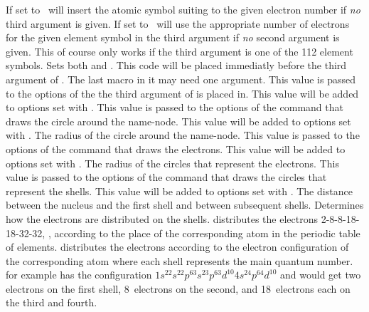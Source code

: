 \documentclass[load-preamble+]{cnltx-doc}
\begin{document}
\begin{options}
    If set to  \BOHR\ will insert the atomic symbol suiting to the
    given electron number if \emph{no} third argument is given.
    If set to  \BOHR\ will use the appropriate number of electrons
    for the given element symbol in the third argument if \emph{no} second
    argument is given.  This of course only works if the third argument is one
    of the 112 element symbols.
    Sets both  and .
  \Default
    This code will be placed immediatly before the third argument of
    .  The last macro in it may need one argument.
  \Default
    This value is passed to the options of the  the third argument
    of  is placed in.
  \Default
    This value will be added to options set with .
    This value is passed to the options of the  command that draws
    the circle around the name-node.
  \Default
    This value will be added to options set with .
  \Default{1em}
    The radius of the circle around the name-node.
    This value is passed to the options of the  command that draws
    the electrons.
  \Default
    This value will be added to options set with .
  \Default{1.5pt}
    The radius of the circles that represent the electrons.
    This value is passed to the options of the  command that draws
    the circles that represent the shells.
  \Default
    This value will be added to options set with .
  \Default{1em}
    The distance between the nucleus and the first shell and between subsequent
    shells.
    Determines how the electrons are distributed on the
    shells.   distributes the electrons 2-8-8-18-18-32-32, \ie,
    according to the place of the corresponding atom in the periodic table of
    elements.   distributes the electrons according to the
    electron configuration of the corresponding atom where each shell
    represents the main quantum number.   for example has the
    configuration $1s^22s^22p^63s^23p^63d^{10}4s^24p^64d^{10}$ and would get
    two electrons on the first shell, 8~electrons on the second, and
    18~electrons each on the third and fourth.
\end{options}
\end{document}
